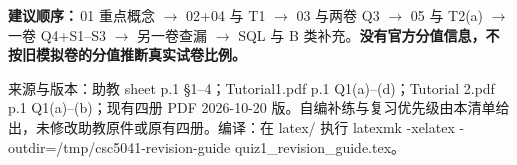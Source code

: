 \documentclass[11pt,a4paper]{article}
\begin{document}
\textbf{建议顺序：}\,01 重点概念 $\rightarrow$ 02+04 与 T1 $\rightarrow$ 03 与两卷 Q3 $\rightarrow$ 05 与 T2(a) $\rightarrow$ 一卷 Q4+S1--S3 $\rightarrow$ 另一卷查漏 $\rightarrow$ SQL 与 B 类补充。\textbf{没有官方分值信息，不按旧模拟卷的分值推断真实试卷比例。}

{\footnotesize\color{Muted}来源与版本：助教 sheet p.1 §1--4；Tutorial1.pdf p.1 Q1(a)--(d)；Tutorial 2.pdf p.1 Q1(a)--(b)；现有四册 PDF 2026-10-20 版。自编补练与复习优先级由本清单给出，未修改助教原件或原有四册。编译：在 latex/ 执行 latexmk -xelatex -outdir=/tmp/csc5041-revision-guide quiz1\_revision\_guide.tex。}
\end{document}
